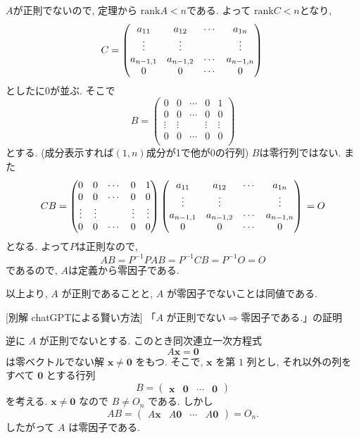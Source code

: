 \documentclass[dvipdfmx,a4paper,11pt]{article} %
\theoremstyle{definition}
\begin{document}
$A$が正則でないので, 定理から
$\mathrm{rank}A<n$である. よって $\mathrm{rank}C<n$となり, 
$$
C=
\begin{pmatrix}
a_{11} & a_{12} & \cdots & a_{1n} \\
\vdots & \vdots & & \vdots \\
a_{n-1,1} & a_{n-1,2} & \cdots & a_{n-1,n} \\
0& 0 & \cdots & 0
\end{pmatrix}\\
$$
としたに0が並ぶ. 
そこで
$$
B=
\begin{pmatrix}
0 & 0 & \cdots & 0  & 1 \\
0& 0 & \cdots & 0 & 0 \\
\vdots & \vdots & & \vdots  & \vdots \\
0&0 & \cdots & 0 &0 \\
\end{pmatrix}
$$
とする. (成分表示すれば$(1,n)$成分が1で他が0の行列)
$B$は零行列ではない. 
また
$$
CB
=
\begin{pmatrix}
0 & 0 & \cdots & 0  & 1 \\
0& 0 & \cdots & 0 & 0 \\
\vdots & \vdots & & \vdots  & \vdots \\
0&0 & \cdots & 0 &0 \\
\end{pmatrix}
\begin{pmatrix}
a_{11} & a_{12} & \cdots & a_{1n} \\
\vdots & \vdots & & \vdots \\
a_{n-1,1} & a_{n-1,2} & \cdots & a_{n-1,n} \\
0& 0 & \cdots & 0
\end{pmatrix}\\
=O
$$
となる. 
よって$P$は正則なので, 
 $$
 AB=P^{-1}PAB=P^{-1}CB=P^{-1}O=O
 $$
であるので, $A$は定義から零因子である. 

以上より, $A$ が正則であることと, $A$ が零因子でないことは同値である.

[別解 chatGPTによる賢い方法] 
「$A$ が正則でない$\Rightarrow $零因子である.」の証明

逆に $A$ が正則でないとする. このとき同次連立一次方程式
\[
A\boldsymbol{x}=\boldsymbol{0}
\]
は零ベクトルでない解 $\boldsymbol{x}\neq\boldsymbol{0}$ をもつ. そこで, $\boldsymbol{x}$ を第 $1$ 列とし, それ以外の列をすべて $\boldsymbol{0}$ とする行列
\[
B=
\begin{pmatrix}
\boldsymbol{x}&\boldsymbol{0}&\cdots&\boldsymbol{0}
\end{pmatrix}
\]
を考える. $\boldsymbol{x}\neq\boldsymbol{0}$ なので $B\neq O_n$ である. しかし
\[
AB
=
\begin{pmatrix}
A\boldsymbol{x}&A\boldsymbol{0}&\cdots&A\boldsymbol{0}
\end{pmatrix}
=
O_n.
\]
したがって $A$ は零因子である.
\end{document}
